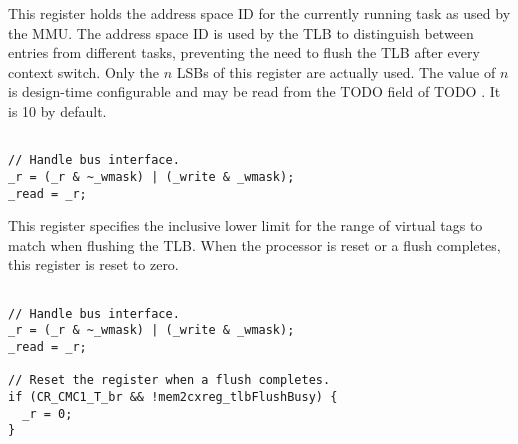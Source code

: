 
This register holds the address space ID for the currently running task as used
by the MMU. The address space ID is used by the TLB to distinguish between
entries from different tasks, preventing the need to flush the TLB after every
context switch. Only the $n$ LSBs of this register are actually used. The value
of $n$ is design-time configurable and may be read from the TODO field of TODO
. It is 10 by default.

\declaration{}
\implementation{}
\begin{lstlisting}

// Handle bus interface.
_r = (_r & ~_wmask) | (_write & _wmask);
_read = _r;

\end{lstlisting}


This register specifies the inclusive lower limit for the range of virtual tags 
to match when flushing the TLB. When the processor is reset or a flush 
completes, this register is reset to zero.

\declaration{}
\implementation{}
\begin{lstlisting}

// Handle bus interface.
_r = (_r & ~_wmask) | (_write & _wmask);
_read = _r;

// Reset the register when a flush completes.
if (CR_CMC1_T_br && !mem2cxreg_tlbFlushBusy) {
  _r = 0;
}

\end{lstlisting}


